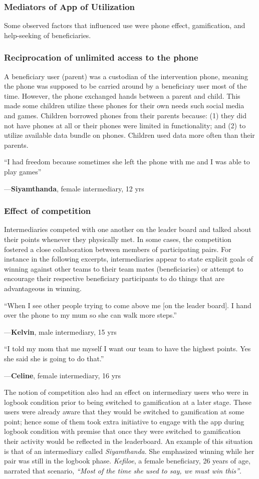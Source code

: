 \documentclass{sig-alternate}
\newenvironment{myquote}
               {\list{}{\rightmargin   \leftmargin
                        \parsep        0in }%
                \item\relax}
               {\endlist}
\newcommand{\userquote}[2]{\begin{samepage}\begin{myquote} 
     \em{\small{#2\begin{flushright}---#1\end{flushright}}}
   \end{myquote}\end{samepage}}
\begin{document}
\subsubsection{Mediators of App of Utilization}
Some observed factors that influenced use were phone effect, gamification, and help-seeking of beneficiaries.

\subsubsection*{\textbf{Reciprocation of unlimited access to the phone}}
A beneficiary user (parent) was a custodian of the intervention phone, meaning the phone was supposed to be carried around by a beneficiary user most of the time. However, the phone exchanged hands between a parent and child. This made some children utilize these phones for their own needs such social media and games. Children borrowed phones from their parents because: (1) they did not have phones at all or their phones were limited in functionality; and (2) to utilize available data bundle on phones. Children used data more often than their parents.

\userquote{\textbf{Siyamthanda}, female intermediary, 12 yrs} {``I had freedom because sometimes she left the phone with me and I was able to play games''}

\subsubsection*{\textbf{Effect of competition}}
Intermediaries competed with one another on the leader board and talked about their points whenever they physically met. In some cases, the competition fostered a close collaboration between members of participating pairs. For instance in the following excerpts, intermediaries appear to state explicit goals of winning against other teams to their team mates (beneficiaries) or attempt to encourage their respective beneficiary participants to do things that are advantageous in winning.

\userquote{\textbf{Kelvin}, male intermediary, 15 yrs} {``When I see other people trying to come above me [on the leader board]. I hand over the phone to my mum so she can walk more steps.''} 

\userquote{\textbf{Celine}, female intermediary, 16 yrs} {``I told my mom that me myself I want our team to have the highest points. Yes she said she is going to do that.''} 

The notion of competition also had an effect on intermediary users who were in logbook condition prior to being switched to gamification at a later stage. These users were already aware that they would be switched to gamification at some point; hence some of them took extra initiative to engage with the app during logbook condition with premise that once they were switched to gamification their activity would be reflected in the leaderboard. An example of this situation is that of an intermediary called  \emph{Siyamthanda}. She emphasized winning while her pair was still in the logbook phase. \emph{Kefiloe}, a female beneficiary, 26 years of age, narrated that scenario, \emph{``Most of the time she used to say, we must win this''}. 
\end{document}
